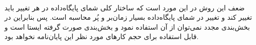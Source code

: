 \paragraph*{}
ضعف این روش در این مورد است که ساختار کلی شمای پایگاه‌داده در هر تغییر باید تغییر کند و تغییر در شمای پایگاه‌داده بسیار زمان‌بر و پُر محاسبه است. پس بنابراین در بخش‌بندی مجدد نمی‌توان از آن استفاده نمود و بخش‌بندی صورت گرفته ایستا
است و قابل استفاده برای حجم کارهای مورد نظر این پایان‌نامه نخواهد بود.

